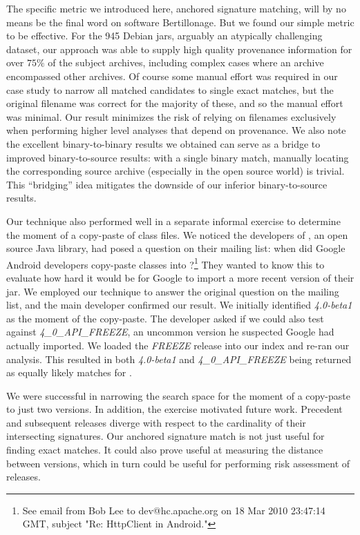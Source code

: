 The specific metric we introduced here, anchored signature matching, will
by no means be the final word on software Bertillonage.  But we found our
simple metric to be effective.  For the 945 Debian jars, arguably
an atypically challenging dataset, our approach was able to supply high quality provenance
information for over $75\%$ of the subject archives, including complex
cases where an archive encompassed other archives.  Of course some manual
effort was required in our case study to narrow all matched candidates to
single exact matches,
but the original filename was correct for the majority of these, and so the
manual effort was minimal.  Our result minimizes the risk of relying on
filenames exclusively when performing higher level analyses that depend on
provenance.  We also note the excellent binary-to-binary results we
obtained can serve as a bridge to improved binary-to-source results:  with
a single binary match, manually locating the corresponding source archive
(especially in the open source world) is trivial.  This ``bridging'' idea
mitigates the downside of our inferior binary-to-source results.

Our technique also performed well in a separate informal exercise to
determine the moment of a copy-paste of class files.  We noticed the
developers of , an open source Java library, had posed
a question on their mailing list: when did Google Android developers
copy-paste  classes into
?\footnote{See email from Bob Lee to dev@hc.apache.org on
18 Mar 2010 23:47:14 GMT, subject "Re: HttpClient in Android."} They wanted
to know this to evaluate how hard it would be for Google to import a more
recent version of their jar.  We employed our technique to answer the
original question on the mailing list, and the main developer confirmed our
result.  We initially identified \emph{4.0-beta1} as the moment of the
copy-paste.  The developer asked if we could also test against
\emph{4\_0\_API\_FREEZE}, an uncommon version he suspected Goo\-gle had
actually imported.  We loaded the \emph{FREEZE} release into our index and
re-ran our analysis.  This resulted in both \emph{4.0-beta1} and
\emph{4\_0\_API\_FREEZE} being returned as equally likely matches for
.

We were successful in narrowing the search space for the moment of a
copy-paste to just two versions.  In addition, the 
exercise motivated future work. Precedent and subsequent releases diverge
with respect to the cardinality of their intersecting signatures.  Our
anchored signature match is not just useful for finding exact matches.  It
could also prove useful at measuring the distance between versions, which
in turn could be useful for performing risk assessment of releases.


